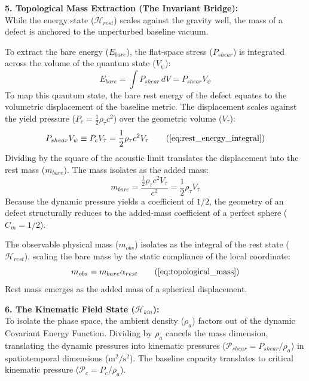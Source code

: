 \textbf{5. Topological Mass Extraction (The Invariant Bridge):} \\
While the energy state ($\mathcal{H}_{rest}$) scales against the gravity well, the mass of a defect is anchored to the unperturbed baseline vacuum. 

To extract the bare energy ($E_{bare}$), the flat-space stress ($P_{shear}$) is integrated across the volume of the quantum state ($V_{\psi}$):
\begin{equation}
    E_{bare} = \int P_{shear} \, dV = P_{shear} V_{\psi} \nonumber
\end{equation}
To map this quantum state, the bare rest energy of the defect equates to the volumetric displacement of the baseline metric. The displacement scales against the yield pressure ($P_c = \frac{1}{2}\rho_\tau c^2$) over the geometric volume ($V_\tau$): 
\begin{equation}
    P_{shear} V_{\psi} \equiv P_c V_{\tau} = \frac{1}{2}\rho_\tau c^2 V_{\tau} \tag{\ref{eq:rest_energy_integral}}
\end{equation}
Dividing by the square of the acoustic limit translates the displacement into the rest mass ($m_{bare}$). The mass isolates as the added mass: 
\begin{equation}
    m_{bare} = \frac{\frac{1}{2}\rho_\tau c^2 V_{\tau}}{c^2} = \frac{1}{2}\rho_\tau V_{\tau} \nonumber
\end{equation}
Because the dynamic pressure yields a coefficient of $1/2$, the geometry of an defect structurally reduces to the added-mass coefficient of a perfect sphere ($C_m = 1/2$). 

The observable physical mass ($m_{obs}$) isolates as the integral of the rest state ($\mathcal{H}_{rest}$), scaling the bare mass by the static compliance of the local coordinate: 
\begin{equation}
    m_{obs} = m_{bare} \alpha_{rest} \tag{\ref{eq:topological_mass}}
\end{equation}
Rest mass emerges as the added mass of a spherical displacement.

\textbf{6. The Kinematic Field State ($\mathcal{H}_{kin}$):} \\
To isolate the phase space, the ambient density ($\rho_a$) factors out of the dynamic Covariant Energy Function. Dividing by $\rho_a$ cancels the mass dimension, translating the dynamic pressures into kinematic pressures ($\mathcal{P}_{shear} = P_{shear}/\rho_a$) in spatiotemporal dimensions ($\text{m}^2/\text{s}^2$). The baseline capacity translates to critical kinematic pressure ($\mathcal{P}_c = P_c/\rho_a$). 


